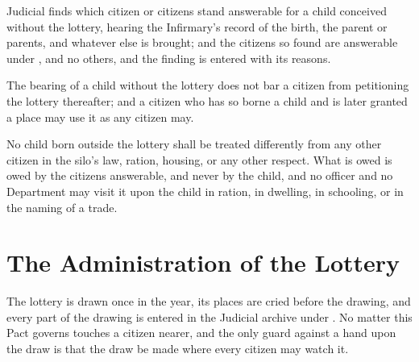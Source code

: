 \begin{clauses}
\item Judicial finds which citizen or citizens stand answerable for a child conceived without the lottery, hearing the Infirmary's record of the birth, the parent or parents, and whatever else is brought; and the citizens so found are answerable under , and no others, and the finding is entered with its reasons.
\item The bearing of a child without the lottery does not bar a citizen from petitioning the lottery thereafter; and a citizen who has so borne a child and is later granted a place may use it as any citizen may.
\item No child born outside the lottery shall be treated differently from any other citizen in the silo's law, ration, housing, or any other respect. What is owed is owed by the citizens answerable, and never by the child, and no officer and no Department may visit it upon the child in ration, in dwelling, in schooling, or in the naming of a trade.
\end{clauses}

\section{The Administration of the Lottery}
\label{sec:marriage:administration-of-the-lottery}

The lottery is drawn once in the year, its places are cried before the drawing, and every part of the drawing is entered in the Judicial archive under . No matter this Pact governs touches a citizen nearer, and the only guard against a hand upon the draw is that the draw be made where every citizen may watch it.

